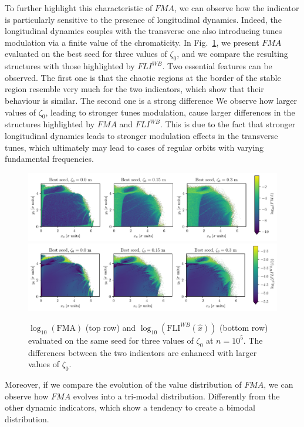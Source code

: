To further highlight this characteristic of $FMA$, we can observe how the indicator is particularly sensitive to the presence of longitudinal dynamics. Indeed, the longitudinal dynamics couples with the transverse one also introducing tunes modulation via a finite value of the chromaticity. In Fig.~\ref{fig:fma_vs_fli}, we present $FMA$ evaluated on the best seed for three values of $\zeta_0$, and we compare the resulting structures with those highlighted by $FLI^{WB}$. Two essential features can be observed. The first one is that the chaotic regions at the border of the stable region resemble very much for the two indicators, which show that their behaviour is similar. The second one is a strong difference We observe how larger values of $\zeta_0$, leading to stronger tunes modulation, cause larger differences in the structures highlighted by $FMA$ and $FLI^{WB}$. This is due to the fact that stronger longitudinal dynamics leads to stronger modulation effects in the transverse tunes, which ultimately may lead to cases of regular orbits with varying fundamental frequencies.   


\begin{figure}[ht]
    \centering
    \includegraphics[width=1.0\textwidth]{6_lhc_dynamic_indicators/figs/FMA.pdf}
    \includegraphics[width=1.0\textwidth]{6_lhc_dynamic_indicators/figs/FMA_addendum.pdf}
    \caption{$\log_{10}(\mathrm{FMA})$ (top row) and $\log_{10}(\mathrm{FLI}^{WB}(\hat{x}))$ (bottom row) evaluated on the same seed for three values of $\zeta_0$ at $n=10^5$. The differences between the two indicators are enhanced with larger values of $\zeta_0$.}
    \label{fig:fma_vs_fli}
\end{figure}

Moreover, if we compare the evolution of the value distribution of $FMA$, we can observe how $FMA$ evolves into a tri-modal distribution. Differently from the other dynamic indicators, which show a tendency to create a 
bimodal distribution.

